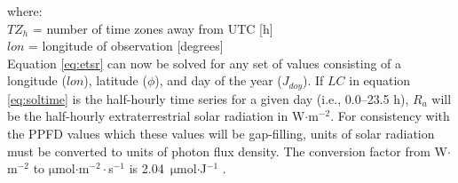 \noindent where: \\
\indent $TZ_{h}$ = number of time zones away from UTC [h] \\
\indent $lon$ = longitude of observation [degrees] \\

Equation \ref{eq:etsr} can now be solved for any set of values consisting of a longitude ($lon$), latitude ($\phi$), and day of the year ($J_{doy}$).  
If $LC$ in equation \ref{eq:soltime} is the half-hourly time series for a given day (i.e., 0.0--23.5 h), $R_{a}$ will be the half-hourly extraterrestrial solar radiation in W$\cdot$m$^{-2}$.  
For consistency with the PPFD values which these values will be gap-filling, units of solar radiation must be converted to units of photon flux density.  
The conversion factor from W$\cdot$m$^{-2}$ to $\mathrm{\mu}$mol$\cdot$m$^{-2}\cdot$s$^{-1}$ is 2.04~$\mathrm{\mu}$mol$\cdot$J$^{-1}$ \parencite{meek84,chen93}.

%
%
